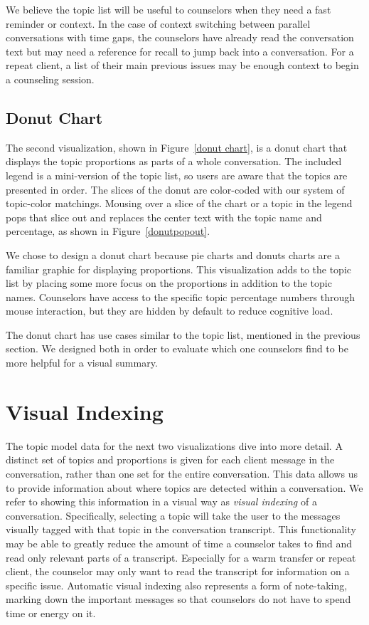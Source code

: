 We believe the topic list will be useful to counselors when they need a fast reminder or context. In the case of context switching between parallel conversations with time gaps, the counselors have already read the conversation text but may need a reference for recall to jump back into a conversation. For a repeat client, a list of their main previous issues may be enough context to begin a counseling session.

\subsection{Donut Chart}

The second visualization, shown in Figure~\ref{donut chart}, is a donut chart that displays the topic proportions as parts of a whole conversation. The included legend is a mini-version of the topic list, so users are aware that the topics are presented in order. The slices of the donut are color-coded with our system of topic-color matchings. Mousing over a slice of the chart or a topic in the legend pops that slice out and replaces the center text with the topic name and percentage, as shown in Figure~\ref{donutpopout}.

We chose to design a donut chart because pie charts and donuts charts are a familiar graphic for displaying proportions. This visualization adds to the topic list by placing some more focus on the proportions in addition to the topic names. Counselors have access to the specific topic percentage numbers through mouse interaction, but they are hidden by default to reduce cognitive load.

The donut chart has use cases similar to the topic list, mentioned in the previous section. We designed both in order to evaluate which one counselors find to be more helpful for a visual summary.

\section{Visual Indexing}

The topic model data for the next two visualizations dive into more detail. A distinct set of topics and proportions is given for each client message in the conversation, rather than one set for the entire conversation. This data allows us to provide information about where topics are detected within a conversation. We refer to showing this information in a visual way as \textit{visual indexing} of a conversation. Specifically, selecting a topic will take the user to the messages visually tagged with that topic in the conversation transcript. This functionality may be able to greatly reduce the amount of time a counselor takes to find and read only relevant parts of a transcript. Especially for a warm transfer or repeat client, the counselor may only want to read the transcript for information on a specific issue. Automatic visual indexing also represents a form of note-taking, marking down the important messages so that counselors do not have to spend time or energy on it.

